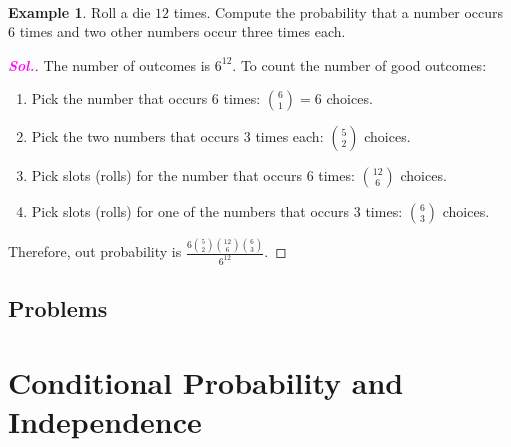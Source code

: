 \documentclass[12pt,a4paper]{article}
\theoremstyle{definition}
\newtheorem{example}{Example}[section]
\theoremstyle{definition}
\theoremstyle{definition}
\theoremstyle{definition}
\theoremstyle{remark}
\theoremstyle{definition}
\newcommand{\dispsty}{\displaystyle}
\newcommand{\sol}{\textcolor{magenta}{\bf \textit{Sol.}}\quad}
\begin{document}
\
\begin{example}
	Roll a die $12$ times. Compute the probability that a number occurs $6$ times and two other numbers occur three times each.\begin{proof}[\sol]
		The number of outcomes is $6^12$. To count the number of good outcomes: \begin{enumerate}
			\item Pick the number that occurs $6$ times: $\binom{6}{1}=6$ choices.
			\item Pick the two numbers that occurs $3$ times each: $\binom{5}{2}$ choices.
			\item Pick slots (rolls) for the number that occurs $6$ times: $\binom{12}{6}$ choices.
			\item Pick slots (rolls) for one of the numbers that occurs $3$ times: $\binom{6}{3}$ choices.
		\end{enumerate} Therefore, out probability is $\dispsty\frac{6\binom{5}{2}\binom{12}{6}\binom{6}{3}}{6^12}$.
	\end{proof}
\end{example}

\subsection{Problems}

\newpage
\section{Conditional Probability and Independence}
\end{document}
